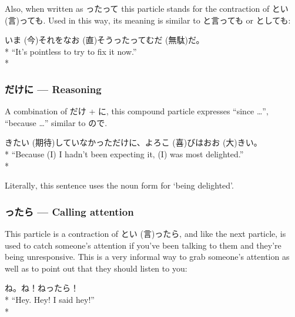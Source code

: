 \documentclass[11pt, b5paper, twoside, openright, onecolumn]{book}
\makeatletter
\newcommand*{\rubystack}[2]{{\relscale{0.5}%
  \begin{tabular}[b]{@{}c@{}}%
    {#1}\\%
   {\textscale{2}{#2}}%
  \end{tabular}}%
}
\DeclareRobustCommand*{\ruby}[2]{%
  \mbox{%
    \setlength{\parskip}{0ex}%
    \BeginAccSupp{method=pdfstringdef,ActualText={#1}}%
      \rubystack{\phantom{#2}}{#1}%
      \llap{%
        \rubystack{#2}{\phantom{#1}}%
      }%
    \EndAccSupp{}%
  }%
}
\renewcommand*{\ruby}[2]{#2 (#1)}%
\newenvironment{exampleblock}{
\setlength{\parindent}{0.6in}
\begin{minipage}[t]{\dimexpr\textwidth-\parindent}}
{\end{minipage}}
\makeatother
\begin{document}
Also‚ when written as ったって this particle stands for the contraction of と\ruby{言}{い}っても. Used in this way‚ its meaning is similar to と言っても or としても:

\vspace{0.4cm}
\begin{exampleblock}
\ruby{今}{いま}それを\ruby{直}{なお}そうったって\ruby{無駄}{むだ}だ。 \\* 
“It’s pointless to try to fix it now.” \\* 
\end{exampleblock}
\subsubsection{だけに — Reasoning}


A combination of だけ + に‚ this compound particle expresses “since …”‚ “because …” similar to ので.

\vspace{0.4cm}
\begin{exampleblock}
\ruby{期待}{きたい}していなかっただけに、\ruby{喜}{よろこ}びは\ruby{大}{おお}きい。 \\* 
“Because (I) I hadn’t been expecting it‚ (I) was most delighted.” \\* 
\end{exampleblock}
\vspace{0.2cm}

Literally‚ this sentence uses the noun form for ‘being delighted’.

\subsubsection{ったら — Calling attention}

This particle is a contraction of と\ruby{言}{い}ったら‚ and like the next particle‚ is used to catch someone’s attention if you’ve been talking to them and they’re being unresponsive. This is a very informal way to grab someone’s attention as well as to point out that they should listen to you:

\vspace{0.4cm}
\begin{exampleblock}
ね。ね！ねったら！ \\* 
“Hey. Hey! I said hey!” \\* 
\end{exampleblock}
\end{document}
